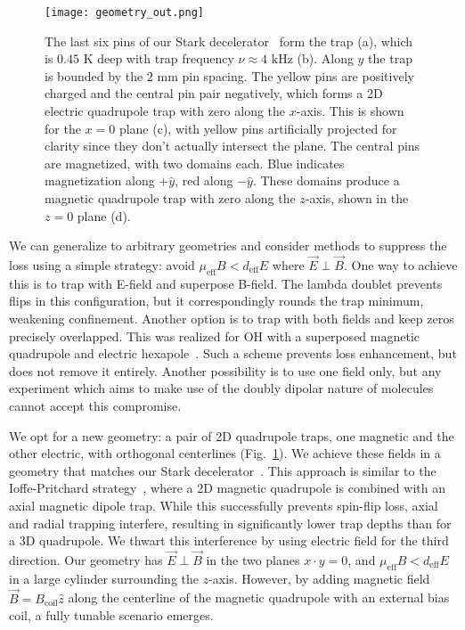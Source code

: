 \documentclass[%
 reprint,
 amsmath,amssymb,
 aps,
prl,
]{revtex4-1}
\newcommand{\epb}{{$\vec{E}\!\perp\!\vec{B}$}}
\begin{document}
\begin{figure}[tb]
\texttt{[image: geometry\_out.png]}%
\caption{
The last six pins of our Stark decelerator~\cite{Sawyer2008} form the trap (a), which is $0.45\text{ K}$ deep with trap frequency $\nu\approx4\text{ kHz}$ (b). 
Along $y$ the trap is bounded by the $2\text{ mm}$ pin spacing. 
The yellow pins are positively charged and the central pin pair negatively, which forms a 2D electric quadrupole trap with zero along the $x$-axis. 
This is shown for the $x=0$ plane (c), with yellow pins artificially projected for clarity since they don't actually intersect the plane. 
The central pins are magnetized, with two domains each. 
Blue indicates magnetization along $+\hat{y}$, red along $-\hat{y}$. 
These domains produce a magnetic quadrupole trap with zero along the $z$-axis, shown in the $z=0$ plane (d). 
\label{fig:CAD}}
\end{figure}

We can generalize to arbitrary geometries and consider methods to suppress the loss using a simple strategy: avoid $\mu_\text{eff}B < d_\text{eff}E$ where \epb. 
One way to achieve this is to trap with E-field and superpose B-field. 
The lambda doublet prevents flips in this configuration, but it correspondingly rounds the trap minimum, weakening confinement. 
Another option is to trap with both fields and keep zeros precisely overlapped. 
This was realized for OH with a superposed magnetic quadrupole and electric hexapole~\cite{Sawyer2007}. 
Such a scheme prevents loss enhancement, but does not remove it entirely. 
Another possibility is to use one field only, but any experiment which aims to make use of the doubly dipolar nature of molecules cannot accept this compromise. 

We opt for a new geometry: a pair of 2D quadrupole traps, one magnetic and the other electric, with orthogonal centerlines (Fig.~\ref{fig:CAD}). 
We achieve these fields in a geometry that matches our Stark decelerator~\cite{Bochinski2003}. 
This approach is similar to the Ioffe-Pritchard strategy~\cite{pritchard1983}, where a 2D magnetic quadrupole is combined with an axial magnetic dipole trap. 
While this successfully prevents spin-flip loss, axial and radial trapping interfere, resulting in significantly lower trap depths than for a 3D quadrupole. 
We thwart this interference by using electric field for the third direction. 
Our geometry has \epb{} in the two planes $x\cdot y=0$, and $\mu_\text{eff}B < d_\text{eff}E$ in a large cylinder surrounding the $z$-axis. 
However, by adding magnetic field $\vec{B}=B_\text{coil}\hat{z}$ along the centerline of the magnetic quadrupole with an external bias coil, a fully tunable scenario emerges. 
\end{document}
